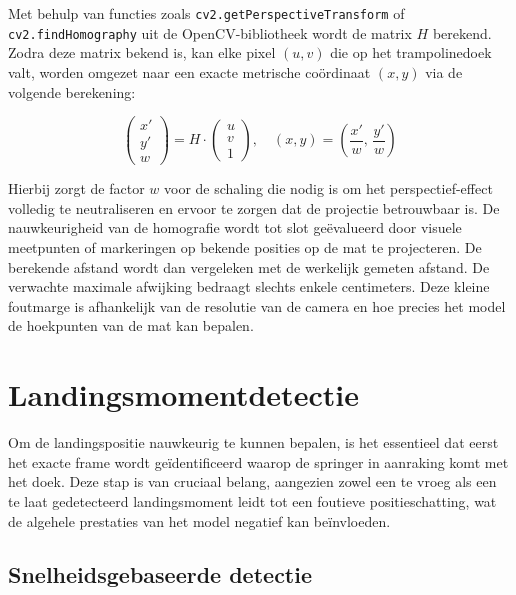 Met behulp van functies zoals \texttt{cv2.getPerspectiveTransform} of \texttt{cv2.findHomography} uit de OpenCV-bibliotheek wordt de matrix $H$ berekend. Zodra deze matrix bekend is, kan elke pixel $(u, v)$ die op het trampolinedoek valt, worden omgezet naar een exacte metrische co{\"o}rdinaat $(x, y)$ via de volgende berekening:

\[
    \begin{pmatrix} x' \\ y' \\ w \end{pmatrix} = H \cdot \begin{pmatrix} u \\ v \\ 1 \end{pmatrix}, \quad (x, y) = \left(\frac{x'}{w},\, \frac{y'}{w}\right)
\]

Hierbij zorgt de factor $w$ voor de schaling die nodig is om het perspectief-effect volledig te neutraliseren en ervoor te zorgen dat de projectie betrouwbaar is. De nauwkeurigheid van de homografie wordt tot slot ge{\"e}valueerd door visuele meetpunten of markeringen op bekende posities op de mat te projecteren. De berekende afstand wordt dan vergeleken met de werkelijk gemeten afstand. De verwachte maximale afwijking bedraagt slechts enkele centimeters. Deze kleine foutmarge is afhankelijk van de resolutie van de camera en hoe precies het model de hoekpunten van de mat kan bepalen.


\section{Landingsmomentdetectie}
\label{sec:landingsmoment}

Om de landingspositie nauwkeurig te kunnen bepalen, is het essentieel dat eerst het exacte frame wordt ge{\"i}dentificeerd waarop de springer in aanraking komt met het doek. Deze stap is van cruciaal belang, aangezien zowel een te vroeg als een te laat gedetecteerd landingsmoment leidt tot een foutieve positieschatting, wat de algehele prestaties van het model negatief kan be{\"i}nvloeden.

\subsection{Snelheidsgebaseerde detectie}
\label{subsec:landingsmoment-pose}


